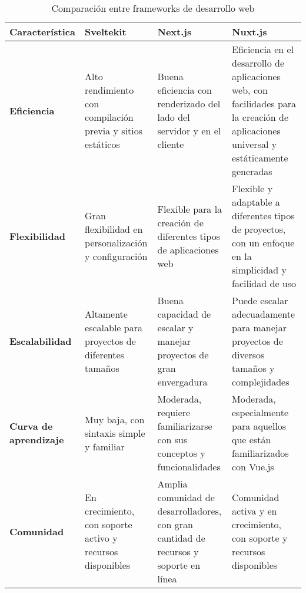 \begin{longtable}{|p{3cm}|p{3cm}|p{4cm}|p{5cm}|}
    \caption{Comparación entre frameworks de desarrollo web}
    \label{table:web-frameworks-comparison}                                                                                                                                                                                                                                                                                    \\
    \hline
    \textbf{Característica}       & \textbf{Sveltekit}                                         & \textbf{Next.js}                                                                      & \textbf{Nuxt.js}                                                                                                                      \\
    \hline
    \endfirsthead
    \textbf{Eficiencia}           & Alto rendimiento con compilación previa y sitios estáticos & Buena eficiencia con renderizado del lado del servidor y en el cliente                & Eficiencia en el desarrollo de aplicaciones web, con facilidades para la creación de aplicaciones universal y estáticamente generadas \\
    \hline
    \textbf{Flexibilidad}         & Gran flexibilidad en personalización y configuración       & Flexible para la creación de diferentes tipos de aplicaciones web                     & Flexible y adaptable a diferentes tipos de proyectos, con un enfoque en la simplicidad y facilidad de uso                             \\
    \hline
    \textbf{Escalabilidad}        & Altamente escalable para proyectos de diferentes tamaños   & Buena capacidad de escalar y manejar proyectos de gran envergadura                    & Puede escalar adecuadamente para manejar proyectos de diversos tamaños y complejidades                                                \\
    \hline
    \textbf{Curva de aprendizaje} & Muy baja, con sintaxis simple y familiar                   & Moderada, requiere familiarizarse con sus conceptos y funcionalidades                 & Moderada, especialmente para aquellos que están familiarizados con Vue.js                                                             \\
    \hline
    \textbf{Comunidad}            & En crecimiento, con soporte activo y recursos disponibles  & Amplia comunidad de desarrolladores, con gran cantidad de recursos y soporte en línea & Comunidad activa y en crecimiento, con soporte y recursos disponibles                                                                 \\
    \hline
\end{longtable}

